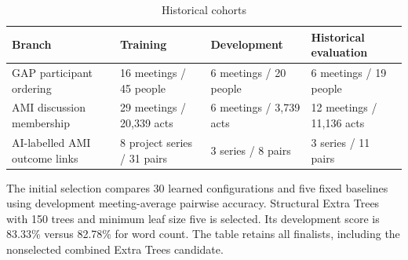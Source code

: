 \documentclass[journal,onecolumn]{IEEEtran}
\begin{document}
\begin{table}[htbp]
\centering\footnotesize
\caption{Historical cohorts}
\setlength{\tabcolsep}{3pt}
\renewcommand{\arraystretch}{1.15}
\begin{tabular}{p{}p{}p{}p{}}
\toprule
{\raggedright Branch\par} & {\raggedright Training\par} & {\raggedright Development\par} & {\raggedright Historical evaluation\par} \\
\midrule
{\raggedright GAP participant ordering\par} & {\raggedright 16 meetings / 45 people\par} & {\raggedright 6 meetings / 20 people\par} & {\raggedright 6 meetings / 19 people\par} \\
{\raggedright AMI discussion membership\par} & {\raggedright 29 meetings / 20,339 acts\par} & {\raggedright 6 meetings / 3,739 acts\par} & {\raggedright 12 meetings / 11,136 acts\par} \\
{\raggedright AI-labelled AMI outcome links\par} & {\raggedright 8 project series / 31 pairs\par} & {\raggedright 3 series / 8 pairs\par} & {\raggedright 3 series / 11 pairs\par} \\
\bottomrule
\end{tabular}
\end{table}
The initial selection compares 30 learned configurations and five fixed baselines using development meeting-average pairwise accuracy. Structural Extra Trees with 150 trees and minimum leaf size five is selected. Its development score is 83.33\% versus 82.78\% for word count. The table retains all finalists, including the nonselected combined Extra Trees candidate.
\end{document}
